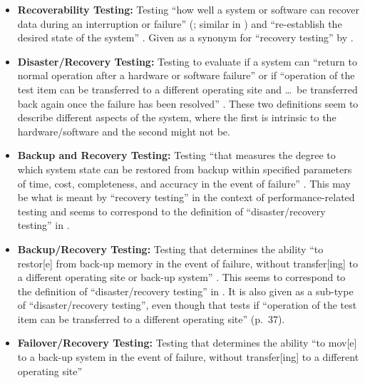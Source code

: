 \begin{itemize}
      \item \textbf{Recoverability Testing:} Testing ``how well a system or
            software can recover data during an interruption or failure''
            (\citealp[p.~7-10]{SWEBOK2024}; similar in \citealp{ISO_IEC2023a})
            and ``re-establish the desired state of the system'' \citep{ISO_IEC2023a}.
            Given as a synonym for ``recovery testing'' by \citet[p.~47]{Kam2008}.
      \item \textbf{Disaster/Recovery Testing:} Testing to evaluate if a system
            can ``return to normal operation after a hardware
            or software failure'' \citep[p.~140]{IEEE2017} or if ``operation of
            the test item can be transferred to a different operating site and
            \dots\ be transferred back again once the failure has been
            resolved'' \citeyearpar[p.~37]{IEEE2021}. These two definitions seem to
            describe different aspects of the system, where the first is
            intrinsic to the hardware/software and the second might not be.
      \item \textbf{Backup and Recovery Testing:} Testing ``that measures the
            degree to which system state can be restored from backup within
            specified parameters of time, cost, completeness, and accuracy in
            the event of failure'' \citep[p.~2]{IEEE2013}. This may be what is
            meant by ``recovery testing'' in the context of performance-related
            testing and seems to correspond to the definition of
            ``disaster/recovery testing'' in \citeyearpar[p.~140]{IEEE2017}.
      \item \textbf{Backup/Recovery Testing:} Testing that determines the
            ability ``to restor[e] from back-up memory in the event of failure,
            without transfer[ing] to a different operating site or back-up
            system'' \citep[p.~37]{IEEE2021}. This seems to correspond to the
            definition of ``disaster/recovery testing'' in
            \citeyearpar[p.~37]{IEEE2021}. It is also given as a sub-type of
            ``disaster/recovery testing'', even though that tests if ``operation
            of the test item can be transferred to a different operating site''
            (p.~37).
      \item \textbf{Failover/Recovery Testing:} Testing that determines the
            ability ``to mov[e] to a back-up system in the event of failure,
            without transfer[ing] to a different operating site''

\end{itemize}
